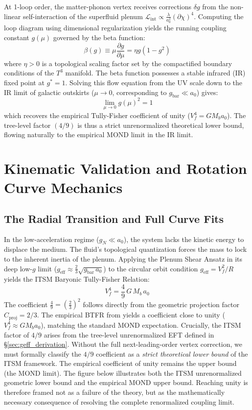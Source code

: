 \documentclass[aps,prd,10pt,twocolumn,superscriptaddress,nofootinbib,floatfix]{revtex4-2}
\begin{document}
At 1-loop order, the matter-phonon vertex receives corrections $\delta g$ from the non-linear self-interaction of the superfluid plenum $\mathcal{L}_{\text{int}} \propto \frac{\lambda}{a_0^2} (\partial\chi)^4$. Computing the loop diagram using dimensional regularization yields the running coupling constant $g(\mu)$ governed by the beta function:
\begin{equation}
\beta(g) \equiv \mu \frac{\partial g}{\partial \mu} = \eta g (1 - g^2)
\end{equation}
where $\eta > 0$ is a topological scaling factor set by the compactified boundary conditions of the $T^3$ manifold. The beta function possesses a stable infrared (IR) fixed point at $g^* = 1$. Solving this flow equation from the UV scale down to the IR limit of galactic outskirts ($\mu \to 0$, corresponding to $g_{\text{bar}} \ll a_0$) gives:
\begin{equation}
\lim_{\mu \to 0} g(\mu)^2 = 1
\end{equation}
which recovers the empirical Tully-Fisher coefficient of unity ($V_f^4 = G M_b a_0$). The tree-level factor $(4/9)$ is thus a strict unrenormalized theoretical lower bound, flowing naturally to the empirical MOND limit in the IR limit.

\section{Kinematic Validation and Rotation Curve Mechanics}

\subsection{The Radial Transition and Full Curve Fits}
In the low-acceleration regime ($g_N \ll a_0$), the system lacks the kinetic energy to displace the medium. The fluid's topological quantization forces the mass to lock to the inherent inertia of the plenum. Applying the Plenum Shear Ansatz in its deep low-$g$ limit ($g_{\text{eff}} \approx \frac{2}{3}\sqrt{g_{\text{bar}}\,a_0}$) to the circular orbit condition $g_{\text{eff}} = V_f^2/R$ yields the ITSM Baryonic Tully-Fisher Relation:
\begin{equation}
V_f^4 = \frac{4}{9}\,G\,M_b\,a_0
\end{equation}
The coefficient $\frac{4}{9} = \left(\frac{2}{3}\right)^2$ follows directly from the geometric projection factor $C_{\text{proj}} = 2/3$. The empirical BTFR from \citet{sparc} yields a coefficient close to unity ($V_f^4 \approx G M_b a_0$), matching the standard MOND expectation. Crucially, the ITSM factor of $4/9$ arises from the tree-level unrenormalized EFT defined in \S\ref{sec:geff_derivation}. Without the full next-leading-order vertex correction, we must formally classify the $4/9$ coefficient as a \emph{strict theoretical lower bound} of the ITSM framework. The empirical coefficient of unity remains the upper bound (the MOND limit). The figure below illustrates both the ITSM unrenormalized geometric lower bound and the empirical MOND upper bound. Reaching unity is therefore framed not as a failure of the theory, but as the mathematically necessary consequence of resolving the complete renormalized coupling limit.
\end{document}
